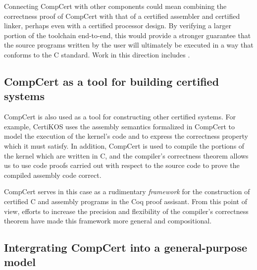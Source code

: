 \documentclass[11pt,oneside,draft]{book}
\theoremstyle{definition}
\begin{document}
Connecting CompCert with other components
could mean combining the correctness proof of CompCert
with that of a certified assembler
and certified linker,
perhaps even with a certified processor design.
By verifying a larger portion of the toolchain end-to-end,
this would provide a stronger guarantee
that the source programs written by the user
will ultimately be executed in a way that conforms to
the C standard.
Work in this direction includes \cite{stackaware}.

\subsection{CompCert as a tool for building certified systems}

CompCert is also used as a tool
for constructing other certified systems.
For example,
CertiKOS uses the assembly semantics formalized in CompCert
to model the execution of the kernel's code
and to express the correctness property
which it must satisfy.
In addition,
CompCert is used to compile the portions of the kernel
which are written in C,
and the compiler's correctness theorem
allows us to use code proofs carried out
with respect to the source code
to prove the compiled assembly code correct.

CompCert serves in this case as
a rudimentary \emph{framework} for the construction of
certified C and assembly programs
in the Coq proof assisant.
From this point of view,
efforts to increase the precision and flexibility
of the compiler's correctness theorem
have made this framework more general and compositional.

\subsection{Intergrating CompCert into a general-purpose model}
\end{document}
